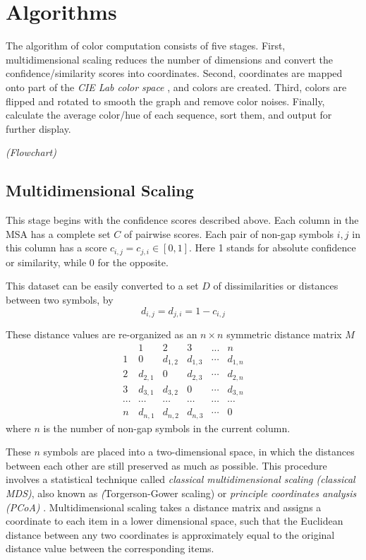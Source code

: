 \chapter{Algorithms}\label{chap:Algorithms}

The algorithm of color computation consists of five stages. First, multidimensional scaling reduces the number of dimensions and convert the confidence/similarity scores into coordinates. Second, coordinates are mapped onto part of the \emph{CIE Lab color space} \cite {McLAREN:1976aa}, and colors are created. Third, colors are flipped and rotated to smooth the graph and remove color noises. Finally, calculate the average color/hue of each sequence, sort them, and output for further display.

\emph{(Flowchart)}

\section{Multidimensional Scaling}

This stage begins with the confidence scores described above. Each column in the MSA has a complete set $C$ of pairwise scores. Each pair of non-gap symbols $i,j$ in this column has a score $c_{i,j}=c_{j,i} \in [0,1]$. Here 1 stands for absolute confidence or similarity, while 0 for the opposite.

This dataset can be easily converted to a set $D$ of dissimilarities or distances between two symbols, by $$d_{i,j}=d_{j,i}=1-c_{i,j}$$

These distance values are re-organized as an $n \times n$ symmetric distance matrix $M$
\[ \begin{array}{cccccc}
            & \mbox{1}  & \mbox{2}  & \mbox{3}  & \mbox{...}  & n       \\
\mbox{1}    & 0         & d_{1,2}   & d_{1,3}   & \cdots      & d_{1,n} \\
\mbox{2}    & d_{2,1}   & 0         & d_{2,3}   & \cdots      & d_{2,n} \\
\mbox{3}    & d_{3,1}   & d_{3,2}   & 0         & \cdots      & d_{3,n} \\
\cdots      & \cdots    & \cdots    & \cdots    & \cdots      & \cdots  \\
n           & d_{n,1}   & d_{n,2}   & d_{n,3}   & \cdots      & 0 \end{array} \]
where $n$ is the number of non-gap symbols in the current column.

These $n$ symbols are placed into a two-dimensional space, in which the distances between each other are still preserved as much as possible. This procedure involves a statistical technique called \emph{classical multidimensional scaling (classical MDS)}, also known as \emph(Torgerson-Gower scaling) or \emph{principle coordinates analysis (PCoA)} \cite{GOWER01121966}. Multidimensional scaling takes a distance matrix and assigns a coordinate to each item in a lower dimensional space, such that the Euclidean distance between any two coordinates is approximately equal to the original distance value between the corresponding items.

